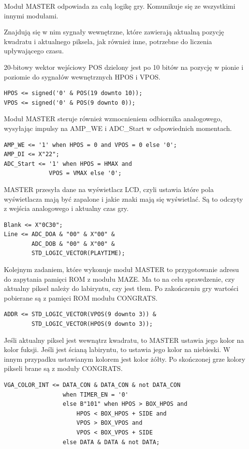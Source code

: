 \documentclass[11pt]{article}
\begin{document}
Moduł MASTER odpowiada za całą logikę gry.
Komunikuje się ze wszystkimi innymi modułami.

Znajdują się w nim sygnały wewnętrzne, które zawierają aktualną pozycję kwadratu i aktualnego piksela, jak również inne, potrzebne do liczenia upływającego czasu.

20-bitowy wektor wejściowy POS dzielony jest po 10 bitów na pozycję w pionie i poziomie do sygnałów wewnętrznych HPOS i VPOS.

\begin{lstlisting}
HPOS <= signed('0' & POS(19 downto 10));
VPOS <= signed('0' & POS(9 downto 0));
\end{lstlisting}

Moduł MASTER steruje również wzmocnieniem odbiornika analogowego, wysyłając impulsy na AMP\_WE i ADC\_Start w odpowiednich momentach.

\begin{lstlisting}
AMP_WE <= '1' when HPOS = 0 and VPOS = 0 else '0';
AMP_DI <= X"22";
ADC_Start <= '1' when HPOS = HMAX and
             VPOS = VMAX else '0';
\end{lstlisting}

MASTER przesyła dane na wyświetlacz LCD, czyli ustawia które pola wyświetlacza mają być zapalone i jakie znaki mają się wyświetlać.
Są to odczyty z wejścia analogowego i aktualny czas gry.

\begin{lstlisting}
Blank <= X"0C30";
Line <= ADC_DOA & "00" & X"00" &
        ADC_DOB & "00" & X"00" &
        STD_LOGIC_VECTOR(PLAYTIME);
\end{lstlisting}	

Kolejnym zadaniem, które wykonuje moduł MASTER to przygotowanie adresu do zapytania pamięci ROM z modułu MAZE.
Ma to na celu sprawdzenie, czy aktualny piksel należy do labiryntu, czy jest tłem.
Po zakończeniu gry wartości pobierane są z pamięci ROM modułu CONGRATS.

\begin{lstlisting}
ADDR <= STD_LOGIC_VECTOR(VPOS(9 downto 3)) &
        STD_LOGIC_VECTOR(HPOS(9 downto 3));
\end{lstlisting}

Jeśli aktualny piksel jest wewnątrz kwadratu, to MASTER ustawia jego kolor na kolor fuksji.
Jeśli jest ścianą labiryntu, to ustawia jego kolor na niebieski.
W innym przypadku ustawianym kolorem jest kolor żółty.
Po skończonej grze kolory pikseli brane są z moduły CONGRATS.

\begin{lstlisting}
VGA_COLOR_INT <= DATA_CON & DATA_CON & not DATA_CON
                 when TIMER_EN = '0'
                 else B"101" when HPOS > BOX_HPOS and
                     HPOS < BOX_HPOS + SIDE and
                     VPOS > BOX_VPOS and
                     VPOS < BOX_VPOS + SIDE
                 else DATA & DATA & not DATA;

\end{lstlisting}
\end{document}
